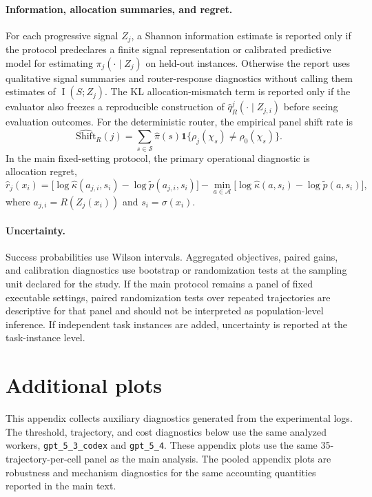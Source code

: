 \documentclass{article}
\DeclareMathOperator{\MI}{I}
\newcommand{\cA}{\mathcal{A}}
\newcommand{\cS}{\mathcal{S}}
\newcommand{\one}{\mathbf{1}}
\begin{document}
\paragraph{Information, allocation summaries, and regret.}
For each progressive signal $Z_j$, a Shannon information estimate is reported only if the protocol predeclares a finite signal representation or calibrated predictive model for estimating $\pi_j(\cdot\mid Z_j)$ on held-out instances.
Otherwise the report uses qualitative signal summaries and router-response diagnostics without calling them estimates of $\MI(S;Z_j)$.
The KL allocation-mismatch term is reported only if the evaluator also freezes a reproducible construction of $\hat q_R^j(\cdot\mid Z_{j,i})$ before seeing evaluation outcomes.
For the deterministic router, the empirical panel shift rate is
\[
\widehat{\mathrm{Shift}}_R(j)=
\sum_{s\in\cS}\hat\pi(s)\one\{\rho_j(\chi_s)\ne\rho_0(\chi_s)\}.
\]
In the main fixed-setting protocol, the primary operational diagnostic is allocation regret,
\[
\hat r_j(x_i)
=
\bigl[\log\hat\kappa(a_{j,i},s_i)-\log\tilde p(a_{j,i},s_i)\bigr]
-
\min_{a\in\cA}
\bigl[\log\hat\kappa(a,s_i)-\log\tilde p(a,s_i)\bigr],
\]
where $a_{j,i}=R(Z_j(x_i))$ and $s_i=\sigma(x_i)$.

\paragraph{Uncertainty.}
Success probabilities use Wilson intervals.
Aggregated objectives, paired gains, and calibration diagnostics use bootstrap or randomization tests at the sampling unit declared for the study.
If the main protocol remains a panel of fixed executable settings, paired randomization tests over repeated trajectories are descriptive for that panel and should not be interpreted as population-level inference.
If independent task instances are added, uncertainty is reported at the task-instance level.

\section{Additional plots}
\label{app:diagnostic-plots}

This appendix collects auxiliary diagnostics generated from the experimental logs.
The threshold, trajectory, and cost diagnostics below use the same analyzed workers, \texttt{gpt\_5\_3\_codex} and \texttt{gpt\_5\_4}.
These appendix plots use the same 35-trajectory-per-cell panel as the main analysis.
The pooled appendix plots are robustness and mechanism diagnostics for the same accounting quantities reported in the main text.
\end{document}
